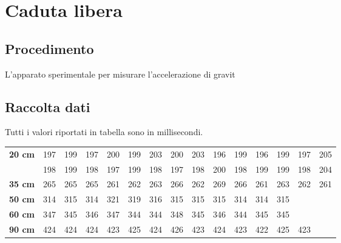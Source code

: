 \section{Caduta libera}
\subsection{Procedimento}
L'apparato sperimentale per misurare l'accelerazione di gravit
\subsection{Raccolta dati}
Tutti i valori riportati in tabella sono in millisecondi.
\begin{center}
\begin{tabular}{r|*{14}{c}}
\textbf{20 cm} & 197 & 199 & 197 & 200 & 199 & 203 & 200 & 203 & 196 & 199 & 196 & 199 & 197 & 205\\
& 198 & 199 & 198 & 197 & 199 & 198 & 197 & 198 & 200 & 198 & 199 & 199 & 198 & 204\\
\midrule
\textbf{35 cm} & 265 & 265 & 265 & 261 & 262 & 263 & 266 & 262 & 269 & 266 & 261 & 263 & 262 & 261\\
\midrule
\textbf{50 cm} & 314 & 315 & 314 & 321 & 319 & 316 & 315 & 315 & 315 & 314 & 314 & 315\\
\midrule
\textbf{60 cm} & 347 & 345 & 346 & 347 & 344 & 344 & 348 & 345 & 346 & 344 & 345 & 345\\
\midrule
\textbf{90 cm} & 424& 424& 424& 423& 425& 424& 426& 423& 424& 423& 422& 425& 423\\
\end{tabular}
\end{center}

